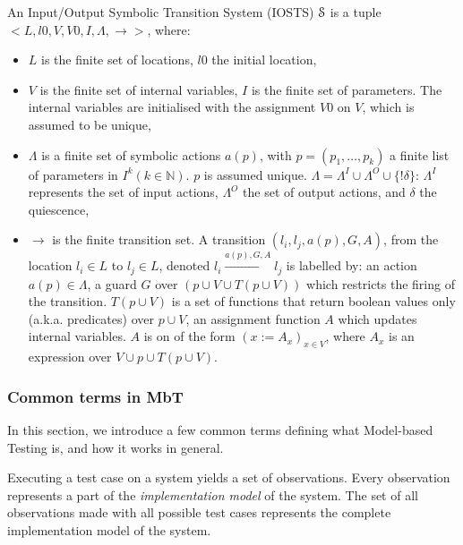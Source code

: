 \begin{definition}
An Input/Output Symbolic Transition System (IOSTS) $\EuScript{S}$
is a tuple $< L,l0,V,V0,I,\Lambda,\rightarrow>$, where:

\begin{itemize}
\item $L$ is the finite set of locations, $l0$ the initial
location,

\item $V$ is the finite set of internal variables, $I$ is the
finite set of parameters. The internal variables are initialised
with the assignment $V0$ on $V$, which is assumed to be unique,

\item $\Lambda$ is a finite set of symbolic actions $a(p)$, with
$p = (p_1,\dots,p_k)$ a finite list of parameters in $I^k(k \in
\mathbb{N})$. $p$ is assumed unique. $\Lambda= \Lambda^I  \cup
\Lambda^O \cup \{!\delta \}$: $\Lambda^I$ represents the set of
input actions, $\Lambda^O$ the set of output actions, and
$\delta$ the quiescence,

\item $\rightarrow$ is the finite transition set. A transition
$(l_i,l_j,a(p),G,A)$, from the location $l_i \in L$ to $l_j \in
L$, denoted $l_i \xrightarrow{a(p),G,A} l_j$ is labelled by: an
action $a(p) \in \Lambda$, a guard  $G$ over $(p \cup V \cup T(p
\cup V))$ which restricts the firing of the transition. $T(p \cup
V)$ is a set of functions that return boolean values only (a.k.a.
predicates) over $p \cup V$, an assignment function $A$ which
updates internal variables. $A$ is on of the form $(x:=A_x)_{x\in
V}$, where $A_x$ is an expression over $V \cup p \cup T(p \cup
V)$.
\end{itemize}
\end{definition}

\subsubsection{Common terms in MbT}

In this section, we introduce a few common terms defining what
Model-based Testing is, and how it works in general.

Executing a test case on a system yields a set of observations.
Every observation represents a part of the \textit{implementation
model} of the system. The set of all observations made with all
possible test cases represents the complete implementation model
of the system.

